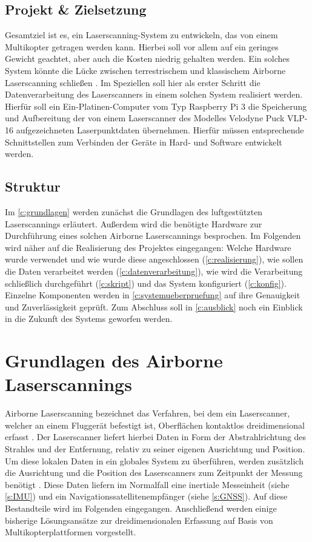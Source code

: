 \documentclass[a4paper,12pt,bibliography=totoc, listof=totoc,titlepage,pointlessnumbers]{scrreprt}
\begin{document}
\section{Projekt \& Zielsetzung}
Gesamtziel ist es, ein Laser\-scan\-ning-System zu entwickeln, das von einem Multikopter getragen werden kann. Hierbei soll vor allem auf ein geringes Gewicht geachtet, aber auch die Kosten niedrig gehalten werden. Ein solches System könnte die Lücke zwischen terrestrischem und klassischem Air\-borne Laser\-scan\-ning schließen \citep[S. 21f]{uav}. Im Speziellen soll hier als erster Schritt die Datenverarbeitung des Laser\-scan\-ners in einem solchen System realisiert werden. Hierfür soll ein Ein-Platinen-Computer vom Typ Rasp\-berry Pi 3 die Speicherung und Aufbereitung der von einem Laser\-scan\-ner des Modelles Velodyne Puck VLP-16 aufgezeichneten Laserpunktdaten übernehmen. Hierfür müssen entsprechende Schnittstellen zum Verbinden der Geräte in Hard- und Software entwickelt werden.

\section{Struktur}
Im \autoref{c:grundlagen} werden zunächst die Grundlagen des luftgestützten Laser\-scan\-nings er\-läu\-tert. Außerdem wird die benötigte Hardware zur Durchführung eines solchen Airborne Laser\-scan\-nings besprochen. Im Folgenden wird näher auf die Realisierung des Projektes eingegangen: Welche Hardware wurde verwendet und wie wurde diese angeschlossen (\autoref{c:realisierung}), wie sollen die Daten verarbeitet werden (\autoref{c:datenverarbeitung}), wie wird die Verarbeitung schließlich durchgeführt (\autoref{c:skript}) und das System konfiguriert (\autoref{c:konfig}). Einzelne Komponenten werden in \autoref{c:systemueberpruefung} auf ihre Genauigkeit und Zuverlässigkeit geprüft. Zum Abschluss soll in \autoref{c:ausblick} noch ein Einblick in die Zukunft des Systems geworfen werden.

\chapter{Grundlagen des Air\-borne Laser\-scan\-nings}
\label{c:grundlagen}

Air\-borne Laser\-scan\-ning bezeichnet das Verfahren, bei dem ein Laser\-scan\-ner, welcher an einem Fluggerät befestigt ist, Oberflächen kontaktlos dreidimensional erfasst \citep[S. 1]{beraldin}. Der Laser\-scan\-ner liefert hierbei Daten in Form der Abstrahlrichtung des Strahles und der Entfernung, relativ zu seiner eigenen Ausrichtung und Position. Um diese lokalen Daten in ein globales System zu überführen, werden zu\-sätz\-lich die Ausrichtung und die Position des Laser\-scan\-ners zum Zeitpunkt der Messung benötigt \citep[S. 22f]{beraldin}. Diese Daten liefern im Normalfall eine inertiale Messeinheit (siehe \autoref{s:IMU}) und ein Navigationssatellitenempfänger (siehe \autoref{s:GNSS}). Auf diese Bestandteile wird im Folgenden eingegangen. Anschließend werden einige bisherige Lösungsansätze zur dreidimensionalen Erfassung auf Basis von Multikopterplattformen vorgestellt.
\end{document}
